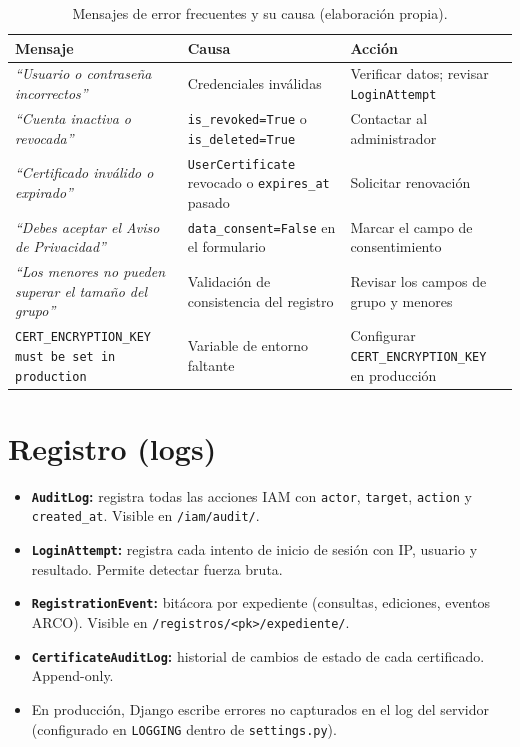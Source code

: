 \documentclass[10pt,letterpaper]{report}
\begin{document}
\begin{table}[H]
\centering
\caption{Mensajes de error frecuentes y su causa (elaboración propia).}
\label{tab:errores}
\begin{tabularx}{\textwidth}{l X X}
\toprule
\textbf{Mensaje} & \textbf{Causa} & \textbf{Acción} \\
\midrule
\textit{``Usuario o contraseña incorrectos''} & Credenciales inválidas & Verificar datos; revisar \texttt{LoginAttempt} \\
\textit{``Cuenta inactiva o revocada''} & \texttt{is\_revoked=True} o \texttt{is\_deleted=True} & Contactar al administrador \\
\textit{``Certificado inválido o expirado''} & \texttt{UserCertificate} revocado o \texttt{expires\_at} pasado & Solicitar renovación \\
\textit{``Debes aceptar el Aviso de Privacidad''} & \texttt{data\_consent=False} en el formulario & Marcar el campo de consentimiento \\
\textit{``Los menores no pueden superar el tamaño del grupo''} & Validación de consistencia del registro & Revisar los campos de grupo y menores \\
\texttt{CERT\_ENCRYPTION\_KEY must be set in production} & Variable de entorno faltante & Configurar \texttt{CERT\_ENCRYPTION\_KEY} en producción \\
\bottomrule
\end{tabularx}
\end{table}

\section{Registro (logs)}

\begin{itemize}[leftmargin=*]
    \item \textbf{\texttt{AuditLog}:} registra todas las acciones IAM con \texttt{actor}, \texttt{target}, \texttt{action} y \texttt{created\_at}. Visible en \texttt{/iam/audit/}.
    \item \textbf{\texttt{LoginAttempt}:} registra cada intento de inicio de sesión con IP, usuario y resultado. Permite detectar fuerza bruta.
    \item \textbf{\texttt{RegistrationEvent}:} bitácora por expediente (consultas, ediciones, eventos ARCO). Visible en \texttt{/registros/<pk>/expediente/}.
    \item \textbf{\texttt{CertificateAuditLog}:} historial de cambios de estado de cada certificado. Append-only.
    \item En producción, Django escribe errores no capturados en el log del servidor (configurado en \texttt{LOGGING} dentro de \texttt{settings.py}).
\end{itemize}
\end{document}
